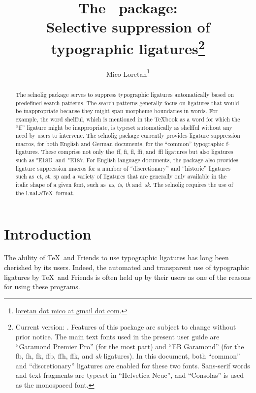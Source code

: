 \documentclass[12pt]{article}
\title{The \pname\ package: \\
Selective suppression of typographic ligatures\thanks{
Current version: \pversion. Features of this package are subject to change without prior notice. The main text fonts used in the present user guide are \enquote{Garamond Premier Pro} (for the most part) and \enquote{EB Garamond} (for the \bgroup\ebg \mbox{fb}, \mbox{fh}, \mbox{fk}, \mbox{ffb}, \mbox{ffh},  \mbox{ffk}, and \emph{\mbox{sk}} ligatures\egroup). In this document, both \enquote{common} and \enquote{discretionary} ligatures are enabled for these two fonts. Sans-serif words and text fragments are typeset in \enquote{Helvetica Neue}, and \enquote{Consolas} is used as the monospaced font.}}
\author{Mico Loretan\thanks{
\href{mailto:loretan.mico@gmail.com}{loretan dot mico at gmail dot com}.}}
\date{\pdate}
\newcommand{\pkg}[1]{\textsf{#1}}
\begin{document}
\VerbatimFootnotes
{}
\thispagestyle{empty}
\maketitle


\begin{abstract}
\noindent
The \pkg{selnolig} package serves to suppress typographic ligatures automatically based on predefined search patterns. The search patterns generally focus on ligatures that would be inappropriate because they might span morpheme boundaries in words. For example, the word shel\mbox{ff}ul, which is mentioned in the \TeX book as a word for which the \enquote{ff} ligature might be inappropriate, is typeset automatically as shelfful without any need by users to intervene.
\newline\hspace*{\parindent}
The \pkg{selnolig} package currently provides ligature suppression macros, for both English and German documents, for the \enquote{common} typographic f-ligatures. These comprise not only the~ff, fi, fl, ffi, and~ffl ligatures but also ligatures such as \char"E18D\ and~\char"E187. For English language documents, the package also provides ligature suppression macros for a number of  \enquote{discretionary} and \enquote{historic} ligatures such as~ct, st, sp and a variety of ligatures that are generally only available in the italic shape of a given font, such as~\emph{as}, \emph{is}, \emph{th} and~{\ebg\emph{sk}}.
\newline\hspace*{\parindent}
The \pkg{selnolig} requires the use of the Lua\LaTeX\ format. 
\end{abstract}
\thispagestyle{empty}

\tableofcontents

\clearpage
{}
\section{Introduction}

The ability of \TeX\ and Friends to use typographic ligatures has long been cherished by its users. Indeed, the automated and transparent use of typographic ligatures by \TeX\ and Friends is often held up by their users as one of the reasons for using these programs.
\end{document}
